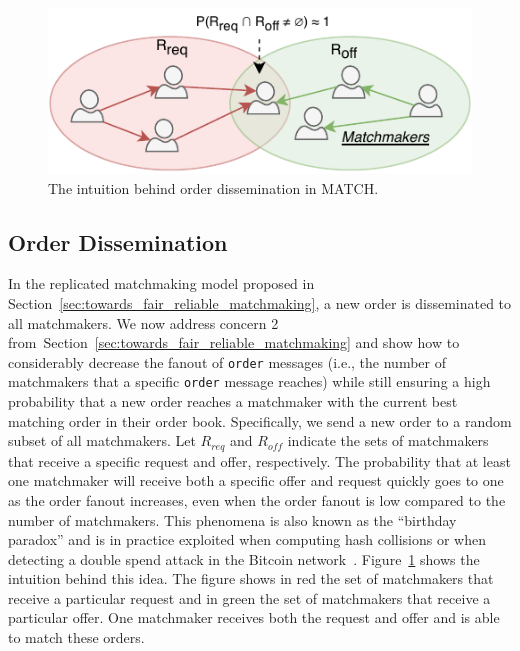 \begin{figure}[t]
	\centering
	\includegraphics[width=.8\linewidth]{match/assets/matching_idea}
	\caption{The intuition behind order dissemination in MATCH.}
	\label{fig:matching_idea}
\end{figure}

\subsection{Order Dissemination}
\label{sec:order_dissemination}
In the replicated matchmaking model proposed in Section~\ref{sec:towards_fair_reliable_matchmaking}, a new order is disseminated to all matchmakers.
We now address concern 2 from~Section~\ref{sec:towards_fair_reliable_matchmaking} and show how to considerably decrease the fanout of \texttt{order} messages (i.e., the number of matchmakers that a specific \texttt{order} message reaches) while still ensuring a high probability that a new order reaches a matchmaker with the current best matching order in their order book.
Specifically, we send a new order to a random subset of all matchmakers.
Let $ R_{req} $ and $ R_{off} $ indicate the sets of matchmakers that receive a specific request and offer, respectively.
The probability that at least one matchmaker will receive both a specific offer and request quickly goes to one as the order fanout increases, even when the order fanout is low compared to the number of matchmakers.
This phenomena is also known as the \enquote{birthday paradox} and is in practice exploited when computing hash collisions or when detecting a double spend attack in the Bitcoin network~\cite{schreiber2020k}.
Figure~\ref{fig:matching_idea} shows the intuition behind this idea.
The figure shows in red the set of matchmakers that receive a particular request and in green the set of matchmakers that receive a particular offer.
One matchmaker receives both the request and offer and is able to match these orders.

